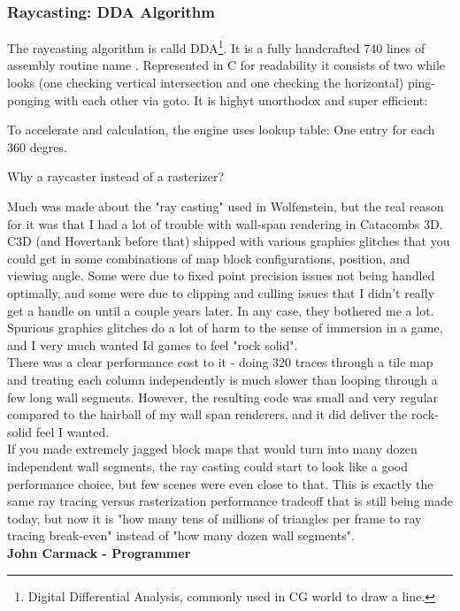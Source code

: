  
 
 
 
\subsubsection{Raycasting: DDA Algorithm}
The raycasting algorithm is calld DDA\footnote{Digital Differential Analysis, commonly used in CG world to draw a line.}. It is a fully handcrafted 740 lines of assembly routine name . Represented in C for readability it consists of two while looks (one checking vertical intersection and one checking the horizontal) ping-ponging with each other via goto. It is highyt unorthodox and super efficient:\\
\par

\begin{minipage}{\textwidth}

\end{minipage}

 To accelerate  and  calculation, the engine uses lookup table: One entry for each 360 degres.




\begin{fancyquotes}
Why a raycaster instead of a rasterizer?\\
\par
Much was made about the "ray casting" used in Wolfenstein, but the real reason for it was that I had a lot of trouble with wall-span rendering in Catacombs 3D.  C3D (and Hovertank before that) shipped with various graphics glitches that you could get in some combinations of map block configurations, position, and viewing angle.  Some were due to fixed point precision issues not being handled optimally, and some were due to clipping and culling issues that I didn't really get a handle on until a couple years later.  In any case, they bothered me a lot.  Spurious graphics glitches do a lot of harm to the sense of immersion in a game, and I very much wanted Id games to feel "rock solid".
 \bigskip \\
There was a clear performance cost to it - doing 320 traces through a tile map and treating each column independently is much slower than looping through a few long wall segments.  However, the resulting code was small and very regular compared to the hairball of my wall span renderers, and it did deliver the rock-solid feel I wanted.
 \bigskip \\
If you made extremely jagged block maps that would turn into many dozen independent wall segments, the ray casting could start to look like a good performance choice, but few scenes were even close to that.  This is exactly the same ray tracing versus rasterization performance tradeoff that is still being made today, but now it is "how many tens of millions of triangles per frame to ray tracing break-even" instead of "how many dozen wall segments".
 \bigskip \\
\textbf{John Carmack - Programmer}
 \end{fancyquotes}







